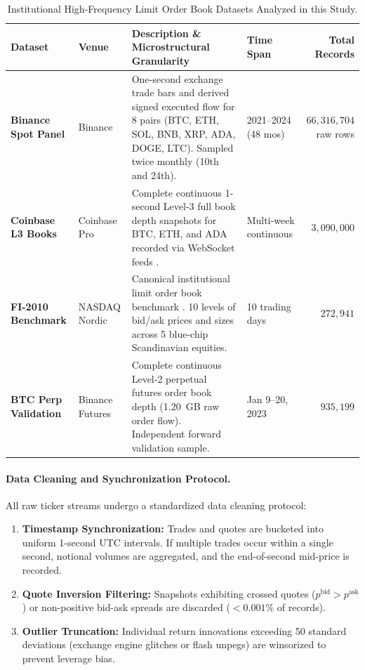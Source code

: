 \documentclass[12pt]{article}
\theoremstyle{definition}
\theoremstyle{remark}
\begin{document}
\begin{table}[htbp]
\centering\footnotesize
\setlength{\tabcolsep}{4pt}
\caption{Institutional High-Frequency Limit Order Book Datasets Analyzed in this Study.}
\label{tab:datasets}
\begin{tabularx}{\textwidth}{p{2.6cm}p{1.8cm}Xp{2.0cm}r}\toprule
Dataset & Venue & Description \& Microstructural Granularity & Time Span & Total Records \\\midrule
\textbf{Binance Spot Panel} & Binance & One-second exchange trade bars and derived signed executed flow for 8 pairs (BTC, ETH, SOL, BNB, XRP, ADA, DOGE, LTC). Sampled twice monthly (10th and 24th). & 2021--2024 (48 mos) & $66{,}316{,}704$ raw rows \\
\textbf{Coinbase L3 Books} & Coinbase Pro & Complete continuous 1-second Level-3 full book depth snapshots for BTC, ETH, and ADA recorded via WebSocket feeds \citep{crypto_rl_2021}. & Multi-week continuous & $3{,}090{,}000$ \\
\textbf{FI-2010 Benchmark} & NASDAQ Nordic & Canonical institutional limit order book benchmark \citep{ntakaris2018benchmark}. 10 levels of bid/ask prices and sizes across 5 blue-chip Scandinavian equities. & 10 trading days & $272{,}941$ \\
\textbf{BTC Perp Validation} & Binance Futures & Complete continuous Level-2 perpetual futures order book depth (1.20~GB raw order flow). Independent forward validation sample. & Jan 9--20, 2023 & $935{,}199$ \\\bottomrule
\end{tabularx}
\end{table}

\paragraph{Data Cleaning and Synchronization Protocol.}
All raw ticker streams undergo a standardized data cleaning protocol:
\begin{enumerate}
    \item \textbf{Timestamp Synchronization:} Trades and quotes are bucketed into uniform 1-second UTC intervals. If multiple trades occur within a single second, notional volumes are aggregated, and the end-of-second mid-price is recorded.
    \item \textbf{Quote Inversion Filtering:} Snapshots exhibiting crossed quotes ($p^{\text{bid}} > p^{\text{ask}}$) or non-positive bid-ask spreads are discarded ($<0.001\%$ of records).
    \item \textbf{Outlier Truncation:} Individual return innovations exceeding 50 standard deviations (exchange engine glitches or flash unpegs) are winsorized to prevent leverage bias.
\end{enumerate}
\end{document}
